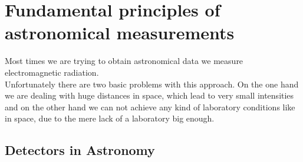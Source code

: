 \chapter{Fundamental principles of astronomical measurements}
Most times we are trying to obtain astronomical data we measure electromagnetic radiation. \\
Unfortunately there are two basic problems with this approach. On the one hand we are dealing with huge distances in space, which lead to very small intensities and on the other hand we can not achieve any kind of laboratory conditions like in space, due to the mere lack of a laboratory big enough.

\section{Detectors in Astronomy}

